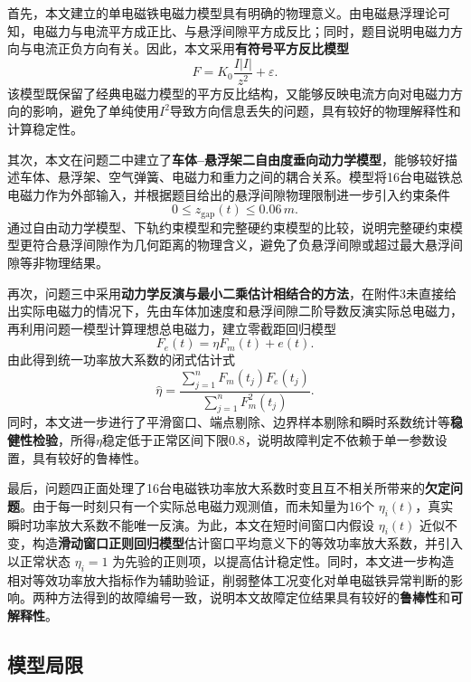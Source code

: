 \documentclass[a4paper]{nmmcm}
\begin{document}
首先，本文建立的单电磁铁电磁力模型具有明确的物理意义。由电磁悬浮理论可知，电磁力与电流平方成正比、与悬浮间隙平方成反比；同时，题目说明电磁力方向与电流正负方向有关。因此，本文采用\textbf{有符号平方反比模型}
\begin{equation}
F=K_0\frac{I|I|}{z^2}+\varepsilon.
\end{equation}
该模型既保留了经典电磁力模型的平方反比结构，又能够反映电流方向对电磁力方向的影响，避免了单纯使用$I^2$导致方向信息丢失的问题，具有较好的物理解释性和计算稳定性。

其次，本文在问题二中建立了\textbf{车体--悬浮架二自由度垂向动力学模型}，能够较好描述车体、悬浮架、空气弹簧、电磁力和重力之间的耦合关系。模型将16台电磁铁总电磁力作为外部输入，并根据题目给出的悬浮间隙物理限制进一步引入约束条件
\begin{equation}
0\leq z_{\mathrm{gap}}(t)\leq 0.06\,m.
\end{equation}
通过自由动力学模型、下轨约束模型和完整硬约束模型的比较，说明完整硬约束模型更符合悬浮间隙作为几何距离的物理含义，避免了负悬浮间隙或超过最大悬浮间隙等非物理结果。

再次，问题三中采用\textbf{动力学反演与最小二乘估计相结合的方法}，在附件3未直接给出实际电磁力的情况下，先由车体加速度和悬浮间隙二阶导数反演实际总电磁力，再利用问题一模型计算理想总电磁力，建立零截距回归模型
\begin{equation}
F_e(t)=\eta F_m(t)+e(t).
\end{equation}
由此得到统一功率放大系数的闭式估计式
\begin{equation}
\hat{\eta}=
\frac{\sum_{j=1}^{n}F_m(t_j)F_e(t_j)}
{\sum_{j=1}^{n}F_m^2(t_j)}.
\end{equation}
同时，本文进一步进行了平滑窗口、端点剔除、边界样本剔除和瞬时系数统计等\textbf{稳健性检验}，所得$\eta$稳定低于正常区间下限$0.8$，说明故障判定不依赖于单一参数设置，具有较好的鲁棒性。

最后，问题四正面处理了16台电磁铁功率放大系数时变且互不相关所带来的\textbf{欠定问题}。由于每一时刻只有一个实际总电磁力观测值，而未知量为16个 $\eta_i(t)$，真实瞬时功率放大系数不能唯一反演。为此，本文在短时间窗口内假设 $\eta_i(t)$ 近似不变，构造\textbf{滑动窗口正则回归模型}估计窗口平均意义下的等效功率放大系数，并引入以正常状态 $\eta_i=1$ 为先验的正则项，以提高估计稳定性。同时，本文进一步构造相对等效功率放大指标作为辅助验证，削弱整体工况变化对单电磁铁异常判断的影响。两种方法得到的故障编号一致，说明本文故障定位结果具有较好的\textbf{鲁棒性}和\textbf{可解释性}。

\subsection{模型局限}
\end{document}
